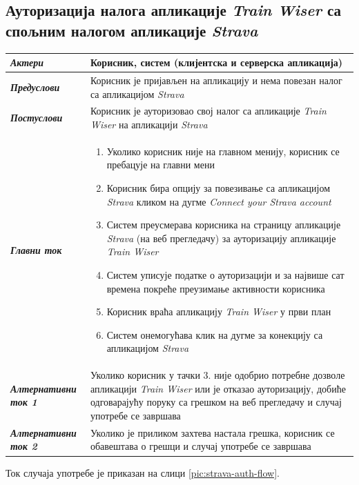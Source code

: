 \documentclass[12pt,oneside]{memoir}
\begin{document}
\subsection*{Ауторизација налога апликације \textit{Train Wiser} са спољним налогом апликације \textit{Strava}}
\begin{longtable}{p{0.23\linewidth} p{0.77\linewidth}}
 \hline
 \textit{\textbf{Актери}} & Корисник, систем (клијентска и серверска апликација) \\
\hline
\textit{\textbf{Предуслови}} & Корисник је пријављен на апликацију и нема повезан налог са апликацијом \textit{Strava} \\
 \hline
\textit{\textbf{Постуслови}} & Корисник је ауторизовао свој налог са апликације \textit{Train Wiser} на апликацији \textit{Strava} \\
 \hline
 \textit{\textbf{Главни ток}} &  
    \begin{enumerate}
        \item Уколико корисник није на главном менију, корисник се пребацује на главни мени
        \item Корисник бира опцију за повезивање са апликацијом \textit{Strava} кликом на дугме \textit{Connect your Strava account}
        \item Систем преусмерава корисника на страницу апликације \textit{Strava} (на веб прегледачу) за ауторизацију апликације \textit{Train Wiser}
        \item Систем уписује податке о ауторизацији и за највише сат времена покреће преузимање активности корисника
        \item Корисник враћа апликацију \textit{Train Wiser} у први план
        \item Систем онемогућава клик на дугме за конекцију са апликацијом \textit{Strava}
    \end{enumerate}\\
 \hline
\textit{\textbf{Алтернативни ток 1}} & Уколико корисник у тачки 3. није одобрио потребне дозволе апликацији \textit{Train Wiser} или је отказао ауторизацију, добиће одговарајућу поруку са грешком на веб прегледачу и случај употребе се завршава \\
 \hline
\textit{\textbf{Алтернативни ток 2}} & Уколико је приликом захтева настала грешка, корисник се обавештава о грешци и случај употребе се завршава \\
 \hline
\end{longtable}

Ток случаја употребе је приказан на слици \ref{pic:strava-auth-flow}.
\end{document}
